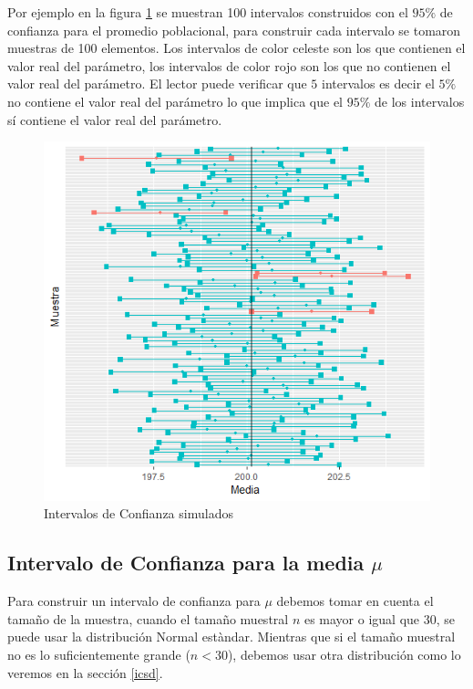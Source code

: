 \documentclass[]{book}
\begin{document}
Por ejemplo en la figura \ref{fig:ic} se muestran 100 intervalos
construidos con el \(95 \%\) de confianza para el promedio poblacional,
para construir cada intervalo se tomaron muestras de 100 elementos. Los
intervalos de color celeste son los que contienen el valor real del
parámetro, los intervalos de color rojo son los que no contienen el
valor real del parámetro. El lector puede verificar que \(5\) intervalos
es decir el \(5 \%\) no contiene el valor real del parámetro lo que
implica que el \(95 \%\) de los intervalos sí contiene el valor real del
parámetro.

\begin{figure}[h]

{\centering \includegraphics[width=0.7\linewidth]{ic} 

}

\caption{Intervalos de Confianza simulados}\label{fig:ic}
\end{figure}

\subsection{\texorpdfstring{Intervalo de Confianza para la media
\(\mu\)}{Intervalo de Confianza para la media \textbackslash{}mu}}\label{intervalo-de-confianza-para-la-media-mu}

Para construir un intervalo de confianza para \(\mu\) debemos tomar en
cuenta el tamaño de la muestra, cuando el tamaño muestral \(n\) es mayor
o igual que \(30\), se puede usar la distribución Normal estàndar.
Mientras que si el tamaño muestral no es lo suficientemente grande
(\(n<30\)), debemos usar otra distribución como lo veremos en la sección
\ref{icsd}.
\end{document}
